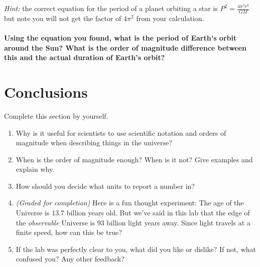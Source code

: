 \documentclass[11pt]{article}
\begin{document}
\textit{Hint:} the correct equation for the period of a planet orbiting a star is $P^2 = \frac{4\pi^2 r^3}{GM}$ but note you will not get the factor of $4\pi^2$ from your calculation.
\\ \\ \noindent
\textbf{Using the equation you found, what is the period of Earth's orbit around the Sun? What is the order of magnitude difference between this and the actual duration of Earth's orbit?}

\section{Conclusions}

Complete this section by yourself.
\begin{enumerate}
    \item Why is it useful for scientists to use scientific notation and orders of magnitude when describing things in the universe?
    \item When is the order of magnitude enough? When is it not? Give examples and explain why.
    \item How should you decide what units to report a number in?
    \item \textit{(Graded for completion)} Here is a fun thought experiment: The age of the Universe is 13.7 billion years old. But we've said in this lab that the edge of the \textit{observable} Universe is 93 billion light years away. Since light travels at a finite speed, how can this be true?
    \item If the lab was perfectly clear to you, what did you like or dislike? If not, what confused you? Any other feedback?
\end{enumerate}
\end{document}
